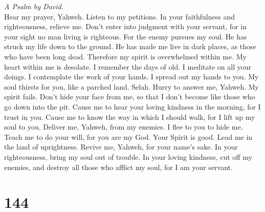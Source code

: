 \emph{A Psalm by David.}\\
 Hear my prayer, Yahweh. Listen to my petitions. In your
faithfulness and righteousness, relieve me.  Don't enter
into judgment with your servant, for in your sight no man living is
righteous.  For the enemy pursues my soul. He has struck
my life down to the ground. He has made me live in dark places, as those
who have been long dead.  Therefore my spirit is
overwhelmed within me. My heart within me is desolate.  I
remember the days of old. I meditate on all your doings. I contemplate
the work of your hands.  I spread out my hands to you. My
soul thirsts for you, like a parched land. Selah.  Hurry
to answer me, Yahweh. My spirit fails. Don't hide your face from me, so
that I don't become like those who go down into the pit. 
Cause me to hear your loving kindness in the morning, for I trust in
you. Cause me to know the way in which I should walk, for I lift up my
soul to you.  Deliver me, Yahweh, from my enemies. I flee
to you to hide me.  Teach me to do your will, for you are
my God. Your Spirit is good. Lead me in the land of uprightness.
 Revive me, Yahweh, for your name's sake. In your
righteousness, bring my soul out of trouble.  In your
loving kindness, cut off my enemies, and destroy all those who afflict
my soul, for I am your servant.

\hypertarget{section-143}{%
\section{144}\label{section-143}}

